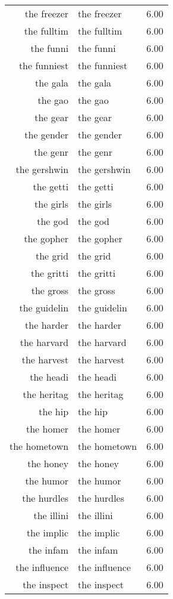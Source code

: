 \begin{table}[ht]
\begin{tabular}{rlr}
  the freezer & the freezer & 6.00 \\ 
  the fulltim & the fulltim & 6.00 \\ 
  the funni & the funni & 6.00 \\ 
  the funniest & the funniest & 6.00 \\ 
  the gala & the gala & 6.00 \\ 
  the gao & the gao & 6.00 \\ 
  the gear & the gear & 6.00 \\ 
  the gender & the gender & 6.00 \\ 
  the genr & the genr & 6.00 \\ 
  the gershwin & the gershwin & 6.00 \\ 
  the getti & the getti & 6.00 \\ 
  the girls & the girls & 6.00 \\ 
  the god & the god & 6.00 \\ 
  the gopher & the gopher & 6.00 \\ 
  the grid & the grid & 6.00 \\ 
  the gritti & the gritti & 6.00 \\ 
  the gross & the gross & 6.00 \\ 
  the guidelin & the guidelin & 6.00 \\ 
  the harder & the harder & 6.00 \\ 
  the harvard & the harvard & 6.00 \\ 
  the harvest & the harvest & 6.00 \\ 
  the headi & the headi & 6.00 \\ 
  the heritag & the heritag & 6.00 \\ 
  the hip & the hip & 6.00 \\ 
  the homer & the homer & 6.00 \\ 
  the hometown & the hometown & 6.00 \\ 
  the honey & the honey & 6.00 \\ 
  the humor & the humor & 6.00 \\ 
  the hurdles & the hurdles & 6.00 \\ 
  the illini & the illini & 6.00 \\ 
  the implic & the implic & 6.00 \\ 
  the infam & the infam & 6.00 \\ 
  the influence & the influence & 6.00 \\ 
  the inspect & the inspect & 6.00 \\ 

\end{tabular}
\end{table}
